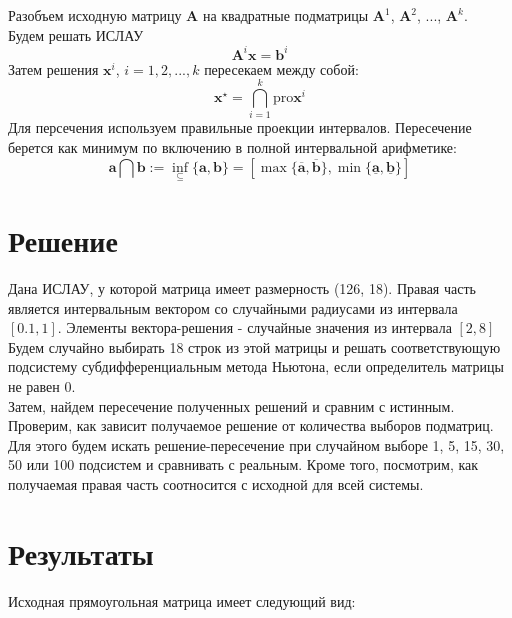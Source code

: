 Разобъем исходную матрицу $\textbf{A}$ на квадратные подматрицы $\textbf{A}^1$, $\textbf{A}^2$, ..., $\textbf{A}^k$. \\

Будем решать ИСЛАУ
\begin{equation}
	\textbf{A}^i \textbf{x} = \textbf{b}^i
\end{equation}
Затем решения $\textbf{x}^i$, $i=1, 2, ..., k$ пересекаем между собой:
\begin{equation}
	\textbf{x}^\star = \bigcap_{i=1}^{k} \text{pro} \textbf{x}^i
\end{equation}
Для персечения используем правильные проекции интервалов. Пересечение берется как минимум по включению в полной интервальной арифметике:
\begin{equation}
	\textbf{a} \bigcap \textbf{b} := \inf_{\subseteq} \{\textbf{a}, \textbf{b}\} = [\max \{ \overline{\textbf{a}}, \overline{\textbf{b}}\}, \min \{\underline{\textbf{a}}, \underline{\textbf{b}}\}]
\end{equation}


\section{Решение}
Дана ИСЛАУ, у которой матрица имеет размерность (126, 18). Правая часть является интервальным вектором со случайными радиусами из интервала $[0.1, 1]$. Элементы вектора-решения - случайные значения из интервала $[2, 8]$ \\

Будем случайно выбирать 18 строк из этой матрицы и решать соответствующую подсистему субдифференциальным метода Ньютона, если определитель матрицы не равен 0. \\

Затем, найдем пересечение полученных решений и сравним с истинным. \\

Проверим, как зависит получаемое решение от количества выборов подматриц. Для этого будем искать решение-пересечение при случайном выборе 1, 5, 15, 30, 50 или 100 подсистем и сравнивать с реальным. Кроме того, посмотрим, как получаемая правая часть соотносится с исходной для всей системы.



\section{Результаты}
Исходная прямоугольная матрица имеет следующий вид:

